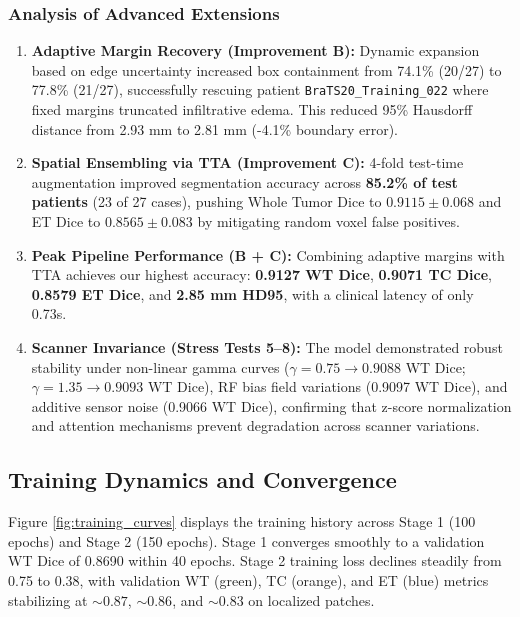 \documentclass[12pt, a4paper]{article}
\begin{document}
\subsubsection{Analysis of Advanced Extensions}
\begin{enumerate}[leftmargin=*, itemsep=4pt]
    \item \textbf{Adaptive Margin Recovery (Improvement B):} Dynamic expansion based on edge uncertainty increased box containment from 74.1\% (20/27) to 77.8\% (21/27), successfully rescuing patient \texttt{BraTS20\_Training\_022} where fixed margins truncated infiltrative edema. This reduced 95\% Hausdorff distance from 2.93 mm to 2.81 mm (-4.1\% boundary error).
    \item \textbf{Spatial Ensembling via TTA (Improvement C):} 4-fold test-time augmentation improved segmentation accuracy across \textbf{85.2\% of test patients} (23 of 27 cases), pushing Whole Tumor Dice to $0.9115 \pm 0.068$ and ET Dice to $0.8565 \pm 0.083$ by mitigating random voxel false positives.
    \item \textbf{Peak Pipeline Performance (B + C):} Combining adaptive margins with TTA achieves our highest accuracy: \textbf{0.9127 WT Dice}, \textbf{0.9071 TC Dice}, \textbf{0.8579 ET Dice}, and \textbf{2.85 mm HD95}, with a clinical latency of only 0.73s.
    \item \textbf{Scanner Invariance (Stress Tests 5--8):} The model demonstrated robust stability under non-linear gamma curves ($\gamma=0.75 \to 0.9088$ WT Dice; $\gamma=1.35 \to 0.9093$ WT Dice), RF bias field variations (0.9097 WT Dice), and additive sensor noise (0.9066 WT Dice), confirming that z-score normalization and attention mechanisms prevent degradation across scanner variations.
\end{enumerate}

\subsection{Training Dynamics and Convergence}
Figure \ref{fig:training_curves} displays the training history across Stage 1 (100 epochs) and Stage 2 (150 epochs). Stage 1 converges smoothly to a validation WT Dice of 0.8690 within 40 epochs. Stage 2 training loss declines steadily from 0.75 to 0.38, with validation WT (green), TC (orange), and ET (blue) metrics stabilizing at $\sim 0.87$, $\sim 0.86$, and $\sim 0.83$ on localized patches.
\end{document}
